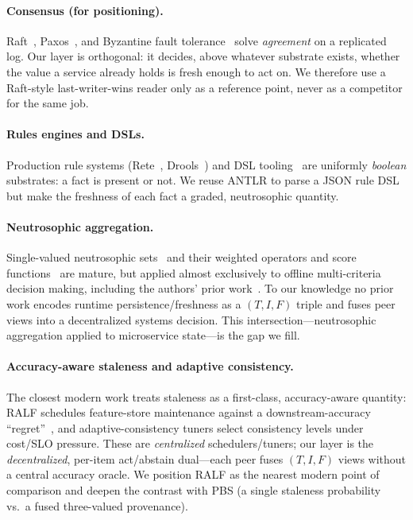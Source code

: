\documentclass[fleqn,10pt]{wlscirep}
\begin{document}
\paragraph{Consensus (for positioning).} Raft~\cite{ongaro2014raft}, Paxos~\cite{lamport1998paxos},
and Byzantine fault tolerance~\cite{castro2002pbft} solve \emph{agreement} on a replicated log. Our
layer is orthogonal: it decides, above whatever substrate exists, whether the value a service already
holds is fresh enough to act on. We therefore use a Raft-style last-writer-wins reader only as a
reference point, never as a competitor for the same job.

\paragraph{Rules engines and DSLs.} Production rule systems (Rete~\cite{forgy1982rete},
Drools~\cite{proctor2012drools}) and DSL tooling~\cite{mernik2005dsl,parr2013antlr} are uniformly
\emph{boolean} substrates: a fact is present or not. We reuse ANTLR to parse a JSON rule DSL but make
the freshness of each fact a graded, neutrosophic quantity.

\paragraph{Neutrosophic aggregation.} Single-valued neutrosophic sets~\cite{wang2010svns,smarandache1999unifying}
and their weighted operators and score functions~\cite{ye2014score,jana2019robust,elghareeb2019package}
are mature, but applied almost exclusively to offline multi-criteria decision making, including the
authors' prior work~\cite{nabeeh2019topsis}. To our knowledge no prior work encodes runtime
persistence/freshness as a $(T,I,F)$ triple and fuses peer views into a decentralized systems
decision. This intersection---neutrosophic aggregation applied to microservice state---is the gap we
fill.

\paragraph{Accuracy-aware staleness and adaptive consistency.} The closest modern work treats
staleness as a first-class, accuracy-aware quantity: RALF schedules feature-store maintenance against
a downstream-accuracy ``regret''~\cite{wooders2024ralf}, and adaptive-consistency tuners select
consistency levels under cost/SLO pressure. These are \emph{centralized} schedulers/tuners; our layer
is the \emph{decentralized}, per-item act/abstain dual---each peer fuses $(T,I,F)$ views without a
central accuracy oracle. We position RALF as the nearest modern point of comparison and deepen the
contrast with PBS (a single staleness probability vs.\ a fused three-valued provenance).
\end{document}
